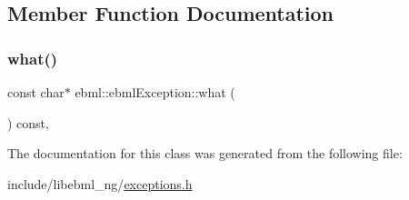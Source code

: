 \subsection{Member Function Documentation}
\mbox{\label{classebml_1_1ebmlException_a63892a18e5ba1fdee6abde1dd4869df8}} 
\subsubsection{\texorpdfstring{what()}{what()}}
{\footnotesize\ttfamily const char$\ast$ ebml\+::ebml\+Exception\+::what (\begin{DoxyParamCaption}{ }\end{DoxyParamCaption}) const\hspace{0.3cm}{\ttfamily [override]}, {\ttfamily [noexcept]}}



The documentation for this class was generated from the following file\+:\begin{DoxyCompactItemize}
\item 
include/libebml\+\_\+ng/\mbox{\hyperlink{exceptions_8h}{exceptions.\+h}}\end{DoxyCompactItemize}
